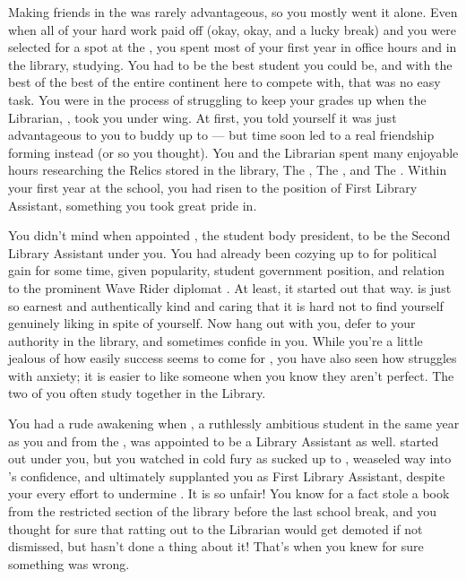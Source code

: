 \documentclass[char]{GL2020}
\begin{document}
Making friends in the \pFarm{} was rarely advantageous, so you mostly went it alone. Even when all of your hard work paid off (okay, okay, and a lucky break) and you were selected for a spot at the \pSchool{}, you spent most of your first year in office hours and in the library, studying. You had to be the best student you could be, and with the best of the best of the entire continent here to compete with, that was no easy task. You were in the process of struggling to keep your grades up when the Librarian, \cLibrarian{\full}, took you under \cLibrarian{\their} wing. At first, you told yourself it was just advantageous to you to buddy up to \cLibrarian{\them} — but time soon led to a real friendship forming instead (or so you thought). You and the Librarian spent many enjoyable hours researching the Relics stored in the library, The \iLariat{}, The \iNet{}, and The \iScythe{}. Within your first year at the school, you had risen to the position of First Library Assistant, something you took great pride in.

You didn't mind when \cLibrarian{} appointed \cPresident{\full}, the student body president, to be the Second Library Assistant under you. You had already been cozying up to \cPresident{} for political gain for some time, given \cPresident{\their} popularity, student government position, and relation to the prominent Wave Rider diplomat \cHeadDiplomat{\full}. At least, it started out that way. \cPresident{} is just so earnest and authentically kind and caring that it is hard not to find yourself genuinely liking \cPresident{\them} in spite of yourself. Now \cPresident{\they} hang\cPresident{\verbs} out with you, defer\cPresident{\verbs} to your authority in the library, and sometimes confide\cPresident{\verbs} in you. While you're a little jealous of how easily success seems to come for \cPresident{}, you have also seen how \cPresident{\they} struggles with anxiety; it is easier to like someone when you know they aren't perfect. The two of you often study together in the Library.

You had a rude awakening when \cAmbition{\full}, a ruthlessly ambitious student in the same year as you and from the \pTech{}, was appointed to be a Library Assistant as well. \cAmbition{\They} started out under you, but you watched in cold fury as \cAmbition{\they} sucked up to \cLibrarian{}, weaseled \cAmbition{\their} way into \cLibrarian{}’s confidence, and ultimately supplanted you as First Library Assistant, despite your every effort to undermine \cAmbition{\them}. It is so unfair! You know for a fact \cAmbition{} stole a book from the restricted section of the library before the last school break, and you thought for sure that ratting \cAmbition{\them} out to the Librarian would get \cAmbition{\them} demoted if not dismissed, but \cLibrarian{} hasn't done a thing about it! That's when you knew for sure something was wrong. 
\end{document}
